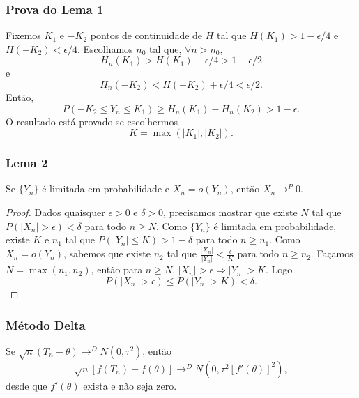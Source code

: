 \begin{frame}
\frametitle{\textbf{Prova do Lema 1}}
\baselineskip=13pt
\begin{block}{}

Fixemos $K_1$ e $-K_2$ pontos de continuidade de $H$ tal que
$H(K_1)>1-\epsilon/4$ e $H(-K_2)<\epsilon/4$. Escolhamos $n_0$ tal
que, $\forall n>n_0$,
$$H_n(K_1)>H(K_1)-\epsilon/4>1-\epsilon/2$$
e
$$H_n(-K_2)<H(-K_2)+\epsilon/4<\epsilon/2.$$
Então,
$$P(-K_2\leq Y_n\leq K_1)\geq H_n(K_1)-H_n(K_2)>1-\epsilon.$$
O resultado está provado se escolhermos $$K=\max(|K_1|,|K_2|).$$

\end{block}
\end{frame}

\begin{frame}
\frametitle{\textbf{Lema 2}}


\begin{lema} \label{lem:delta2} Se $\{Y_n\}$ é limitada em probabilidade e
$X_n=o(Y_n)$, então $X_n\rightarrow^P 0$. \end{lema}

\begin{proof} Dados quaisquer $\epsilon>0$ e $\delta>0$, precisamos mostrar
que existe $N$ tal que $P(|X_n|>\epsilon)<\delta$ para todo $n\geq
N$. Como $\{Y_n\}$ é limitada em probabilidade, existe $K$ e $n_1$
tal que $P(|Y_n|\leq K)>1-\delta$ para todo $n\geq n_1$. Como
$X_n=o(Y_n)$, sabemos que existe $n_2$ tal que
$\frac{|X_n|}{|Y_n|}<\frac{\epsilon}{K}$ para todo $n\geq n_2$.
Façamos $N=\max(n_1,n_2)$, então para $n\geq N$,
$|X_n|>\epsilon\Rightarrow |Y_n|>K$. Logo
$$P(|X_n|>\epsilon)\leq P(|Y_n|>K)<\delta.$$ \end{proof}

\end{frame}

\begin{frame}
\frametitle{\textbf{Método Delta}}


\begin{teo} Se $\sqrt{n}(T_n-\theta)\rightarrow^D N(0,\tau^2)$, então
\begin{equation} \label{eq:delta1}
\sqrt{n}[f(T_n)-f(\theta)]\rightarrow^D N(0,\tau^2[f'(\theta)]^2),
\end{equation}
desde que $f'(\theta)$ exista e não seja zero.
\end{teo}

\end{frame}


